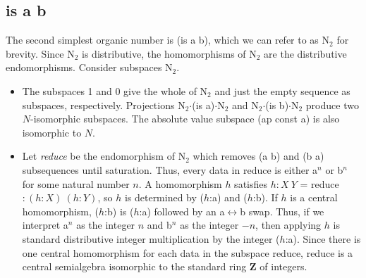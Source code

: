 \documentclass[11pt]{article}
\begin{document}
\subsection{is a b} 

The second simplest organic number is (is a b), which we can refer to as N$_2$ for brevity.  Since N$_2$ is distributive, the homomorphisms of N$_2$ 
are the distributive endomorphisms.  Consider subspaces N$_2$.  

\begin{itemize}
\item{The subspaces 1 and 0 give the whole of N$_2$ and just the empty sequence as subspaces, respectively.  
Projections N$_2$$\cdot$(is a)$\cdot$N$_2$ and N$_2$$\cdot$(is b)$\cdot$N$_2$ produce two $N$-isomorphic subspaces. The absolute value 
subspace (ap const a) is also isomorphic to $N$.}

\item{Let {\it reduce} be the endomorphism of N$_2$ which removes (a b) and (b a) subsequences until saturation.  Thus, every data in reduce
is either a$^n$ or b$^n$ for some natural number $n$.  A homomorphism $h$ satisfies $h:X\ Y$ = reduce $:(h:X)\ (h:Y)$, so 
$h$ is determined by ($h$:a) and ($h$:b).  If $h$ is a central homomorphism, ($h$:b) is ($h$:a) followed by an 
a$\leftrightarrow$b swap.  Thus, if we interpret a$^n$ as the integer $n$ and b$^n$ as the integer $-n$, then applying $h$ 
is standard distributive integer multiplication by the integer ($h$:a).  Since there is one central homomorphism for each data in the subspace reduce, 
reduce is a central semialgebra isomorphic to the standard ring $\mathbf Z$ of integers.}


\end{itemize}
\end{document}
